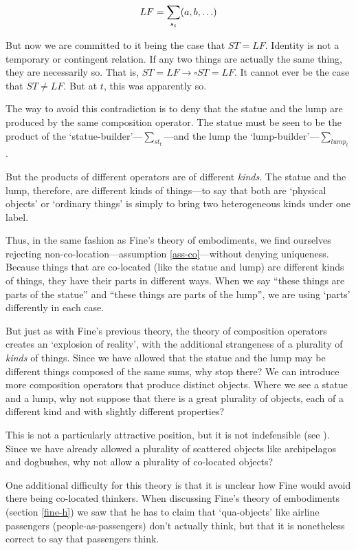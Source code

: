 \documentclass[11pt]{article}
\begin{document}
\begin{spacing}{1.5}
\begin{displaymath}
LF = \sum_{s_t} (a, b, \mathellipsis )
\end{displaymath}

But now we are committed to it being the case that $ST = LF$.
Identity is not a temporary or contingent relation.  If any two things
are actually the same thing, they are necessarily so.  That is, $ST =
LF \rightarrow \square ST = LF$.  It cannot ever be the case that $ST
\neq LF$.  But at $t$, this was apparently so.

The way to avoid this contradiction is to deny that the statue and the
lump are produced by the same composition operator.  The statue must
be seen to be the product of the `statue-builder'---$\sum
_{st_t}$---and the lump the `lump-builder'---$\sum _{lump_t}$.

But the products of different operators are of different {\em kinds}.
The statue and the lump, therefore, are different kinds of things---to
say that both are `physical objects' or `ordinary things' is simply to
bring two heterogeneous kinds under one label.

Thus, in the same fashion as Fine's theory of embodiments, we find
ourselves rejecting non-co-location---assumption
\ref{ass-co}---without denying uniqueness.  Because things that are
co-located (like the statue and lump) are different kinds of things,
they have their parts in different ways.  When we say ``these things
are parts of the statue'' and ``these things are parts of the lump'',
we are using `parts' differently in each case.

But just as with Fine's previous theory, the theory of composition
operators creates an `explosion of reality', with the additional
strangeness of a plurality of {\em kinds} of things.  Since we have
allowed that the statue and the lump may be different things composed
of the same sums, why stop there?  We can introduce more composition
operators that produce distinct objects.  Where we see a statue and a
lump, why not suppose that there is a great plurality of objects, each
of a different kind and with slightly different properties?

This is not a particularly attractive position, but it is not
indefensible (see \citet[section 4]{bennett2004}).  Since we have
already allowed a plurality of scattered objects like archipelagos and
dogbushes, why not allow a plurality of co-located objects?

One additional difficulty for this theory is that it is unclear how
Fine would avoid there being co-located thinkers.  When discussing
Fine's theory of embodiments (section \ref{fine-h}) we saw that he has
to claim that `qua-objects' like airline passengers
(people-as-passengers) don't actually think, but that it is
nonetheless correct to say that passengers think.


\end{spacing}
\end{document}
